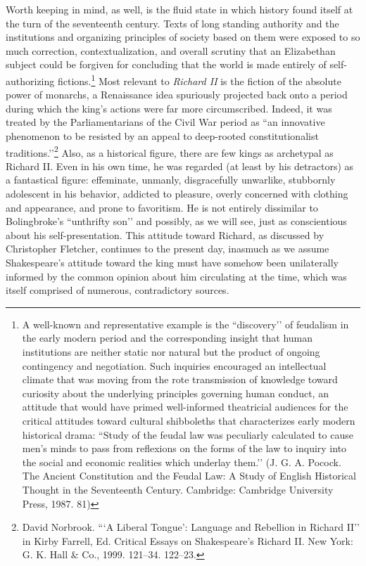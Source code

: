 Worth keeping in mind, as well, is the fluid state in which history found itself at the turn of the seventeenth century.
Texts of long standing authority and the institutions and organizing principles of society based on them were exposed to so much correction, contextualization, and overall scrutiny that an Elizabethan subject could be forgiven for concluding that the world is made entirely of self-authorizing fictions.\footnote{A well-known and representative example is the ``discovery’’ of feudalism in the early modern period and the corresponding insight that human institutions are neither static nor natural but the product of ongoing contingency and negotiation.
Such inquiries encouraged an intellectual climate that was moving from the rote transmission of knowledge toward curiosity about the underlying principles governing human conduct, an attitude that would have primed well-informed theatricial audiences for the critical attitudes toward cultural shibboleths that characterizes early modern historical drama: ``Study of the feudal law was peculiarly calculated to cause men’s minds to pass from reflexions on the forms of the law to inquiry into the social and economic realities which underlay them.’’ (J. G. A. Pocock. The Ancient Constitution and the Feudal Law: A Study of English Historical Thought in the Seventeenth Century. Cambridge: Cambridge University Press, 1987. 81)} Most relevant to \emph{Richard II} is the fiction of the absolute power of monarchs, a Renaissance idea spuriously projected back onto a period during which the king’s actions were far more circumscribed.
Indeed, it was treated by the Parliamentarians of the Civil War period as ``an innovative phenomenon to be resisted by an appeal to deep-rooted constitutionalist traditions.’’\footnote{David Norbrook. ``‘A Liberal Tongue’: Language and Rebellion in Richard II’’ in Kirby Farrell, Ed. Critical Essays on Shakespeare’s Richard II. New York: G. K. Hall \& Co., 1999. 121--34. 122--23.} Also, as a historical figure, there are few kings as archetypal as Richard II.
Even in his own time, he was regarded (at least by his detractors) as a fantastical figure: effeminate, unmanly, disgracefully unwarlike, stubbornly adolescent in his behavior, addicted to pleasure, overly concerned with clothing and appearance, and prone to favoritism.
He is not entirely dissimilar to Bolingbroke’s ``unthrifty son’’ and possibly, as we will see, just as conscientious about his self-presentation.
This attitude toward Richard, as discussed by Christopher Fletcher, continues to the present day, inasmuch as we assume Shakespeare’s attitude toward the king must have somehow been unilaterally informed by the common opinion about him circulating at the time, which was itself comprised of numerous, contradictory sources.
